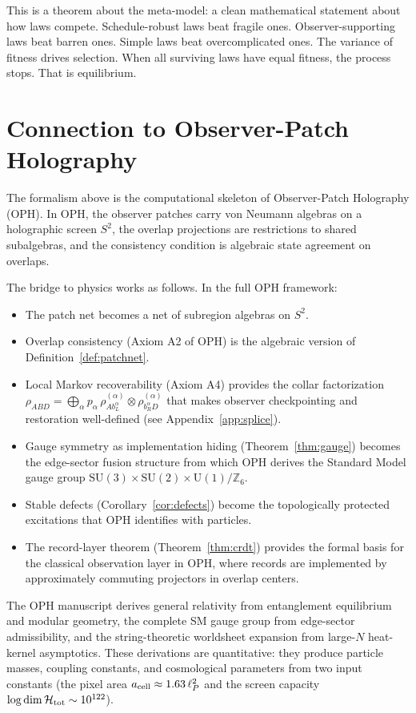 \documentclass[11pt]{article}
\begin{document}
This is a theorem about the meta-model: a clean mathematical statement about how laws compete. Schedule-robust laws beat fragile ones. Observer-supporting laws beat barren ones. Simple laws beat overcomplicated ones. The variance of fitness drives selection. When all surviving laws have equal fitness, the process stops. That is equilibrium.


\section{Connection to Observer-Patch Holography}

The formalism above is the computational skeleton of Observer-Patch Holography (OPH). In OPH, the observer patches carry von Neumann algebras on a holographic screen $S^2$, the overlap projections are restrictions to shared subalgebras, and the consistency condition is algebraic state agreement on overlaps.

The bridge to physics works as follows. In the full OPH framework:

\begin{itemize}
\item The patch net becomes a net of subregion algebras on $S^2$.
\item Overlap consistency (Axiom A2 of OPH) is the algebraic version of Definition~\ref{def:patchnet}.
\item Local Markov recoverability (Axiom A4) provides the collar factorization $\rho_{ABD} = \bigoplus_\alpha p_\alpha\,\rho^{(\alpha)}_{Ab_L^\alpha}\otimes\rho^{(\alpha)}_{b_R^\alpha D}$ that makes observer checkpointing and restoration well-defined (see Appendix~\ref{app:splice}).
\item Gauge symmetry as implementation hiding (Theorem~\ref{thm:gauge}) becomes the edge-sector fusion structure from which OPH derives the Standard Model gauge group $\mathrm{SU}(3)\times\mathrm{SU}(2)\times\mathrm{U}(1)/\mathbb{Z}_6$.
\item Stable defects (Corollary~\ref{cor:defects}) become the topologically protected excitations that OPH identifies with particles.
\item The record-layer theorem (Theorem~\ref{thm:crdt}) provides the formal basis for the classical observation layer in OPH, where records are implemented by approximately commuting projectors in overlap centers.
\end{itemize}

The OPH manuscript derives general relativity from entanglement equilibrium and modular geometry, the complete SM gauge group from edge-sector admissibility, and the string-theoretic worldsheet expansion from large-$N$ heat-kernel asymptotics. These derivations are quantitative: they produce particle masses, coupling constants, and cosmological parameters from two input constants (the pixel area $a_{\rm cell}\approx 1.63\,\ell_P^2$ and the screen capacity $\log\dim\mathcal{H}_{\rm tot}\sim 10^{122}$).
\end{document}
